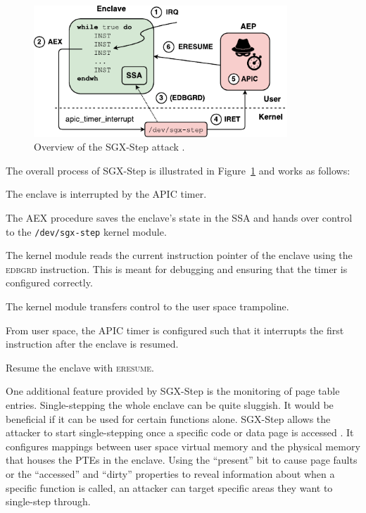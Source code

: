 \documentclass{llncs}
\begin{document}
\begin{figure}[t!]
  \centering
  \includegraphics[width=0.85\textwidth]{images/sgx-step-overview.pdf}
  \caption{Overview of the SGX-Step attack \cite{BulckPS17}.}
  \label{fig:sgx-step}
\end{figure}

The overall process of SGX-Step is illustrated in Figure~\ref{fig:sgx-step} and works as follows:
\begin{enumerate*}
  \item[\ding{172}]
    The enclave is interrupted by the APIC timer.
  \item[\ding{173}]
    The AEX procedure saves the enclave's state in the SSA
    and hands over control to the \texttt{/dev/sgx-step} kernel module.
  \item[\ding{174}]
    The kernel module reads the current instruction pointer of the enclave using the \textsc{edbgrd} instruction.
    This is meant for debugging and ensuring that the timer is configured correctly.
  \item[\ding{175}]
    The kernel module transfers control to the user space trampoline.
  \item[\ding{176}]
    From user space, the APIC timer is configured
    such that it interrupts the first instruction after the enclave is resumed.
  \item[\ding{177}]
    Resume the enclave with \textsc{eresume}.
\end{enumerate*}

One additional feature provided by SGX-Step is the monitoring of page table entries.
Single-stepping the whole enclave can be quite sluggish.
It would be beneficial if it can be used for certain functions alone.
SGX-Step allows the attacker to start single-stepping
once a specific code or data page is accessed \cite{BulckWKPS17}.
It configures mappings between user space virtual memory and
the physical memory that houses the PTEs in the enclave.
Using the ``present'' bit to cause page faults \cite{XuCP15} or
the ``accessed'' and ``dirty'' properties to reveal information about
when a specific function is called,
an attacker can target specific areas they want to single-step through.
\end{document}
